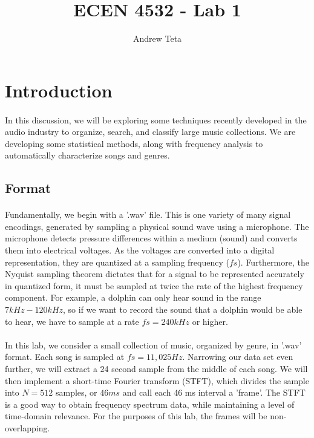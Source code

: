 \documentclass[11pt,a4paper]{article}
\author{Andrew Teta}
\title{ECEN 4532 - Lab 1}
\begin{document}
\maketitle
\section*{Introduction}
\paragraph*{} In this discussion, we will be exploring some techniques recently developed in the audio industry to organize, search, and classify large music collections. We are developing some statistical methods, along with frequency analysis to automatically characterize songs and genres.
\subsection*{Format}
\paragraph*{} Fundamentally, we begin with a '.wav' file. This is one variety of many signal encodings, generated by sampling a physical sound wave using a microphone. The microphone detects pressure differences within a medium (sound) and converts them into electrical voltages. As the voltages are converted into a digital representation, they are quantized at a sampling frequency ($fs$). Furthermore, the Nyquist sampling theorem dictates that for a signal to be represented accurately in quantized form, it must be sampled at twice the rate of the highest frequency component. For example, a dolphin can only hear sound in the range $7kHz-120kHz$, so if we want to record the sound that a dolphin would be able to hear, we have to sample at a rate $fs=240kHz$ or higher.
\paragraph*{} In this lab, we consider a small collection of music, organized by genre, in '.wav' format. Each song is sampled at $fs=11,025Hz$. Narrowing our data set even further, we will extract a 24 second sample from the middle of each song. We will then implement a short-time Fourier transform (STFT), which divides the sample into $N=512$ samples, or $46ms$ and call each 46 ms interval a 'frame'. The STFT is a good way to obtain frequency spectrum data, while maintaining a level of time-domain relevance. For the purposes of this lab, the frames will be non-overlapping.
\end{document}
